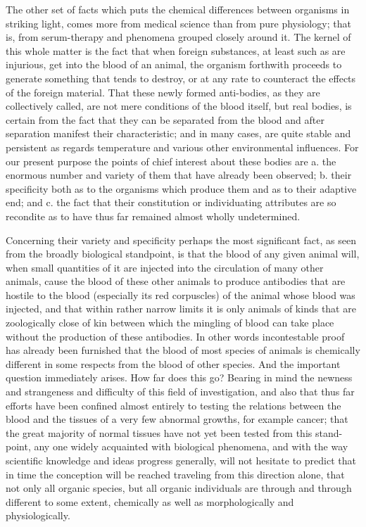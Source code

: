 \documentclass[a4paper, 11pt, oneside, polutonikogreek, english, landscape]{article}
\begin{document}
The other set of facts which puts the chemical differences between organisms in striking light, comes more from medical science than from pure physiology; that is, from serum-therapy and phenomena grouped closely around it. The kernel of this whole matter is the fact that when foreign substances, at least such as are injurious, get into the blood of an animal, the organism forthwith proceeds to generate something that tends to destroy, or at any rate to counteract the effects of the foreign material. That these newly formed anti-bodies, as they are collectively called, are not mere conditions of the blood itself, but real bodies, is certain from the fact that they can be separated from the blood and after separation manifest their characteristic; and in many cases, are quite stable and persistent as regards temperature and various other environmental influences. For our present purpose the points of chief interest about these bodies are a. the enormous number and variety of them that have already been observed; b. their specificity both as to the organisms which produce them and as to their adaptive end; and c. the fact that their constitution or individuating attributes are so recondite as to have thus far remained almost wholly undetermined.

Concerning their variety and specificity perhaps the most significant fact, as seen from the broadly biological standpoint, is that the blood of any given animal will, when small quantities of it are injected into the circulation of many other animals, cause the blood of these other animals to produce antibodies that are hostile to the blood (especially its red corpuscles) of the animal whose blood was injected, and that within rather narrow limits it is only animals of kinds that are zoologically close of kin between which the mingling of blood can take place without the production of these antibodies. In other words incontestable proof has already been furnished that the blood of most species of animals is chemically different in some respects from the blood of other species. And the important question immediately arises. How far does this go? Bearing in mind the newness and strangeness and difficulty of this field of investigation, and also that thus far efforts have been confined almost entirely to testing the relations between the blood and the tissues of a very few abnormal growths, for example cancer; that the great majority of normal tissues have not yet been tested from this stand-point, any one widely acquainted with biological phenomena, and with the way scientific knowledge and ideas progress generally, will not hesitate to predict that in time the conception will be reached traveling from this direction alone, that not only all organic species, but all organic individuals are through and through different to some extent, chemically as well as morphologically and physiologically.
\end{document}
